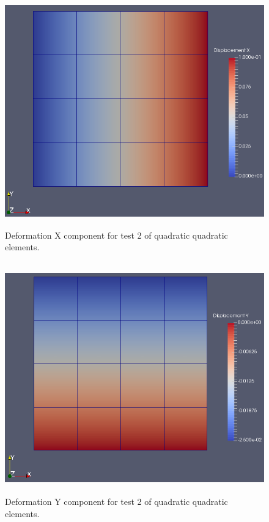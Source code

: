 \documentclass[a4paper, 12pt]{article}
\begin{document}
\begin{figure}[H]
  \centering
  \includegraphics[width=13cm, height=10cm]{Qquad_4_t2_disp_X}
  \caption{Deformation X component for test 2 of quadratic
            quadratic elements.}
  \label{fig:quadQuad2_x}
\end{figure}

\begin{figure}[H]
  \centering
  \includegraphics[width=13cm, height=10cm]{Qquad_4_t2_disp_Y}
  \caption{Deformation Y component for test 2 of quadratic
            quadratic elements.}
  \label{fig:quadQuad2_y}
\end{figure}
\end{document}
